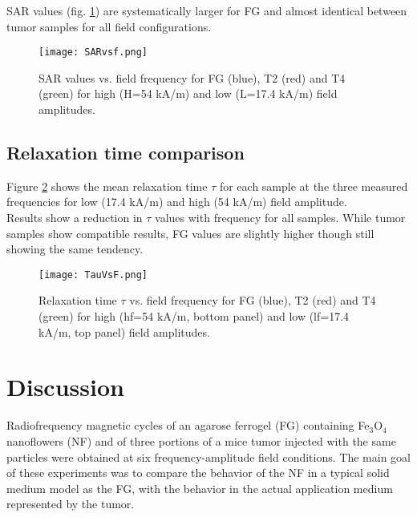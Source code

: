 \documentclass[preprint,12pt]{elsarticle}
\begin{document}
SAR values (fig. \ref{SAR}) are systematically larger for FG and almost identical between tumor samples for all field configurations.\\

\begin{figure}
    \centering
    \texttt{[image: SARvsf.png]}
    \caption{SAR values vs. field frequency for FG (blue), T2 (red) and T4 (green) for high (H=54 kA/m) and low (L=17.4 kA/m)  field amplitudes.}
    \label{SAR}
\end{figure}

\subsection{Relaxation time comparison}
Figure \ref{tau} shows the mean relaxation time $\tau$ for each sample at the three measured frequencies for low (17.4 kA/m) and high (54 kA/m) field amplitude.\\ 
Results show a reduction in $\tau$ values with frequency for all samples. While tumor samples show compatible results, FG values are slightly higher though still showing the same tendency. 

\begin{figure}
    \centering
    \texttt{[image: TauVsF.png]}
    \caption{Relaxation time $\tau$ vs. field frequency for FG (blue), T2 (red) and T4 (green) for high (hf=54 kA/m, bottom panel) and low (lf=17.4 kA/m, top panel) field amplitudes.}
    \label{tau}
\end{figure}

\section{Discussion}
Radiofrequency magnetic cycles of an agarose ferrogel (FG) containing Fe$_3$O$_4$ nanoflowers (NF) and of three portions of a mice tumor injected with the same particles were obtained at six frequency-amplitude field conditions. The main goal of these experiments was to compare the behavior of the NF in a typical solid medium model as the FG, with the behavior in the actual application medium represented by the tumor.\\
\end{document}
